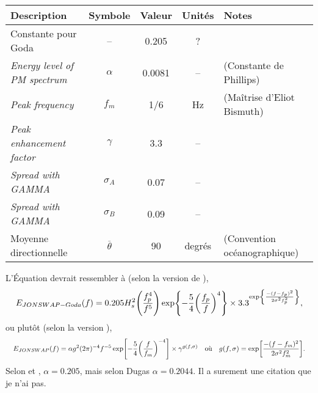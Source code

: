 \documentclass[10pt]{article}
\numberwithin{equation}{section}
\begin{document}
\begin{center}
\begin{tabular}{lcccl}
\hline
\hline
Description & Symbole & Valeur & Unités & Notes\\
\hline
Constante pour Goda & -- & 0.205 & ? & \Textcite{goda1988variablity}\\
\emph{Energy level of PM spectrum} & \(\alpha\) & 0.0081 & -- & \Textcite{wwiii2016user} (Constante de Phillips)\\
\emph{Peak frequency} & \(f_m\) & 1/6 & Hz & (Maîtrise d'Eliot Bismuth)\\
\emph{Peak enhancement factor} & \(\gamma\) & 3.3 & -- & \Textcite{hasselmann1973measurements,wwiii2016user}\\
\emph{Spread with GAMMA} & \(\sigma_A\) & 0.07 & -- & \Textcite{hasselmann1973measurements,wwiii2016user}\\
\emph{Spread with GAMMA} & \(\sigma_B\) & 0.09 & -- & \Textcite{hasselmann1973measurements,wwiii2016user}\\
Moyenne directionnelle & \(\overline{\theta}\) & 90 & degrés & \Textcite{wwiii2016user} (Convention océanographique)\\
\hline
\end{tabular}
\end{center}

L'Équation devrait ressembler à (selon la version de \Textcite{goda1988variablity}),
\begin{equation}
   E_{JONSWAP-Goda}(f) = 0.205 H_s^2 \qty(\frac{f_p^4}{f^5}) \exp{-\frac{5}{4}\qty(\frac{f_p}{f})^4} \times 3.3^{\exp{\frac{-(f-f_p)^2}{2\sigma^2 f_p^2}}},
\end{equation}
ou plutôt (selon la version \Textcite{hasselmann1973measurements}), 
\begin{align}
   && E_{JONSWAP}(f) = \alpha g^2 (2\pi)^{-4} f^{-5} \exp[- \frac{5}{4} \qty(\frac{f}{f_m})^{-4}]\times \gamma^{g(f,\sigma)}
   && \text{où}
   && g(f,\sigma) = \exp[ \frac{-(f-f_m)^2}{2\sigma^2f_m^2}]. &&
\end{align}
Selon \Textcite{goda1988variablity} et \Textcite{hasselmann1973measurements}, \(\alpha = 0.205\), mais selon Dugas \(\alpha = 0.2044\). Il a surement une citation que je n'ai pas.

\printbibliography
\end{document}
